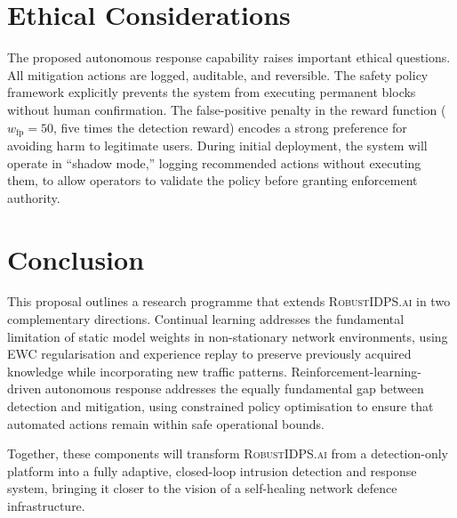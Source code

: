 \documentclass[12pt,a4paper]{article}
\newcommand{\RobustIDPS}{\textsc{RobustIDPS.ai}}
\theoremstyle{definition}
\begin{document}
\section{Ethical Considerations}
\label{sec:ethics}

The proposed autonomous response capability raises important ethical questions.
All mitigation actions are logged, auditable, and reversible.
The safety policy framework explicitly prevents the system from executing permanent blocks without human confirmation.
The false-positive penalty in the reward function ($w_{\text{fp}} = 50$, five times the detection reward) encodes a strong preference for avoiding harm to legitimate users.
During initial deployment, the system will operate in ``shadow mode,'' logging recommended actions without executing them, to allow operators to validate the policy before granting enforcement authority.


\section{Conclusion}
\label{sec:conclusion}

This proposal outlines a research programme that extends \RobustIDPS{} in two complementary directions.
Continual learning addresses the fundamental limitation of static model weights in non-stationary network environments, using EWC regularisation and experience replay to preserve previously acquired knowledge while incorporating new traffic patterns.
Reinforcement-learning-driven autonomous response addresses the equally fundamental gap between detection and mitigation, using constrained policy optimisation to ensure that automated actions remain within safe operational bounds.

Together, these components will transform \RobustIDPS{} from a detection-only platform into a fully adaptive, closed-loop intrusion detection and response system, bringing it closer to the vision of a self-healing network defence infrastructure.
\end{document}
